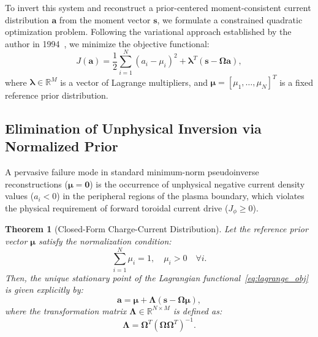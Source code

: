 \documentclass[11pt,a4paper]{article}
\newtheorem{theorem}{Theorem}
\begin{document}
To invert this system and reconstruct a prior-centered moment-consistent current distribution $\bm{a}$ from the moment vector $\bm{s}$, we formulate a constrained quadratic optimization problem. Following the variational approach established by the author in 1994~\cite{ahn1994preliminary}, we minimize the objective functional:
\begin{equation}
    J(\bm{a}) = \frac{1}{2} \sum_{i=1}^N (a_i - \mu_i)^2 + \bm{\lambda}^T (\bm{s} - \bm{\Omega}\bm{a}),
    \label{eq:lagrange_obj}
\end{equation}
where $\bm{\lambda} \in \mathbb{R}^M$ is a vector of Lagrange multipliers, and $\bm{\mu} = [\mu_1, \dots, \mu_N]^T$ is a fixed reference prior distribution. 

\subsection{Elimination of Unphysical Inversion via Normalized Prior}
A pervasive failure mode in standard minimum-norm pseudoinverse reconstructions ($\bm{\mu} = \bm{0}$) is the occurrence of unphysical negative current density values ($a_i < 0$) in the peripheral regions of the plasma boundary, which violates the physical requirement of forward toroidal current drive ($J_\phi \ge 0$).

\begin{theorem}[Closed-Form Charge-Current Distribution]
Let the reference prior vector $\bm{\mu}$ satisfy the normalization condition:
\begin{equation}
    \sum_{i=1}^N \mu_i = 1, \quad \mu_i > 0 \quad \forall i.
    \label{eq:mu_normalization}
\end{equation}
Then, the unique stationary point of the Lagrangian functional~\eqref{eq:lagrange_obj} is given explicitly by:
\begin{equation}
    \bm{a} = \bm{\mu} + \bm{\Lambda} (\bm{s} - \bm{\Omega} \bm{\mu}),
    \label{eq:a_solution}
\end{equation}
where the transformation matrix $\bm{\Lambda} \in \mathbb{R}^{N \times M}$ is defined as:
\begin{equation}
    \bm{\Lambda} = \bm{\Omega}^T (\bm{\Omega} \bm{\Omega}^T)^{-1}.
    \label{eq:lambda_def}
\end{equation}
\end{theorem}
\end{document}
